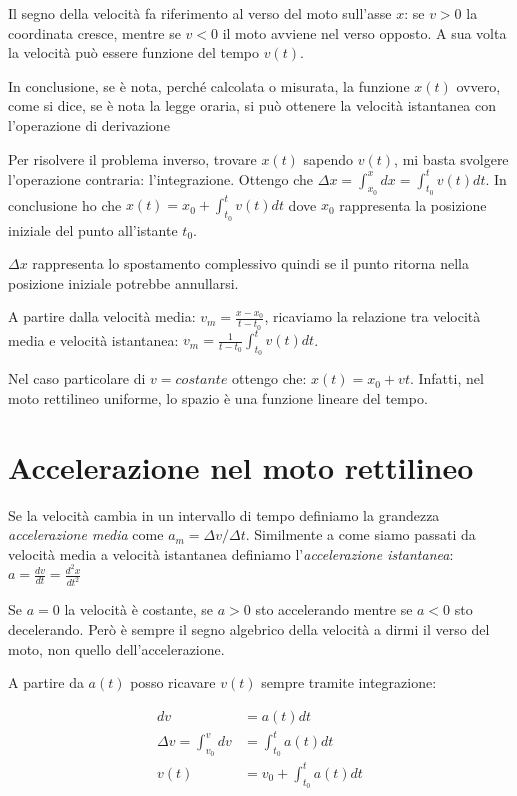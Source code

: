 \documentclass[class=book, crop=false, oneside, 12pt]{standalone}
\begin{document}
Il segno della velocità fa riferimento al verso del moto sull'asse
\(x\): se \(v >0\) la coordinata cresce, mentre se \(v < 0\) il moto
avviene nel verso opposto. A sua volta la velocità può essere funzione
del tempo \(v(t)\).

In conclusione, se è nota, perché calcolata o misurata, la funzione
\(x(t)\) ovvero, come si dice, se è nota la legge oraria, si può
ottenere la velocità istantanea con l'operazione di derivazione

Per risolvere il problema inverso, trovare \(x(t)\) sapendo \(v(t)\), mi
basta svolgere l'operazione contraria: l'integrazione. Ottengo che
\(\Delta x = \int_{x_0}^{x} dx = \int_{t_0}^{t} v(t) dt\). In
conclusione ho che \(x(t) = x_0 + \int_{t_0}^t v(t) dt\) dove \(x_0\)
rappresenta la posizione iniziale del punto all'istante \(t_0\).

\(\Delta x\) rappresenta lo spostamento complessivo quindi se il punto
ritorna nella posizione iniziale potrebbe annullarsi.

A partire dalla velocità media: \(v_m = \frac {x-x_0} {t-t_0}\),
ricaviamo la relazione tra velocità media e velocità istantanea:
\(v_m = \frac {1} {t-t_0} \int_{t_0}^t v(t) dt\).

Nel caso particolare di \(v = costante\) ottengo che:
\(x(t) = x_0 + vt\). Infatti, nel moto rettilineo uniforme, lo spazio è
una funzione lineare del tempo.

\section{Accelerazione nel moto rettilineo}

Se la velocità cambia in un intervallo di tempo definiamo la grandezza
\emph{accelerazione media} come \(a_m = \Delta v / \Delta t\).
Similmente a come siamo passati da velocità media a velocità istantanea
definiamo l'\emph{accelerazione istantanea}:
\(a = \frac {dv} {dt} = \frac {d^2 x}{dt^2}\)

Se \(a=0\) la velocità è costante, se \(a>0\) sto accelerando mentre se
\(a<0\) sto decelerando. Però è sempre il segno algebrico della velocità
a dirmi il verso del moto, non quello dell'accelerazione.

A partire da \(a(t)\) posso ricavare \(v(t)\) sempre tramite
integrazione:

\begin{equation}
  \begin{aligned}
    dv &= a(t) dt\\
    \Delta v = \int_{v_0}^{v}dv &= \int_{t_0}^t a(t) dt\\
    v(t) &= v_0 + \int_{t_0}^{t} a(t) dt
  \end{aligned}
\end{equation}
\end{document}
